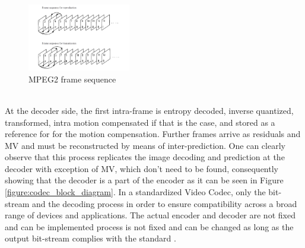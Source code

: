 \documentclass[a4paper,11pt,oneside]{article}
\begin{document}
\begin{figure}[h]
  \centering
  \includegraphics[width=0.4\textwidth]{../figures/frame_sequence_mpeg2.pdf}
  \caption{MPEG2 frame sequence \cite[pp.98]{dsp_henkel}}
  \label{figure:mpeg2_frame_sequence}
\end{figure} \\
\indent At the decoder side, the first intra-frame is entropy decoded, inverse quantized, transformed, intra motion compensated if that is the case, and stored as a reference for for the motion compensation. Further frames arrive as residuals and MV and must be reconstructed by means of inter-prediction. One can clearly observe that this process replicates the image decoding and prediction at the decoder with exception of MV, which don't need to be found, consequently showing that the decoder is a part of the encoder as it can be seen in Figure \ref{figure:codec_block_diagram}.
\indent In a standardized Video Codec, only the bit-stream and the decoding process in order to ensure compatibility across a broad range of devices and applications. The actual encoder and decoder are not fixed and can be implemented process is not fixed and can be changed as long as the output bit-stream complies with the standard \cite{vsp_coursera}.
\end{document}
